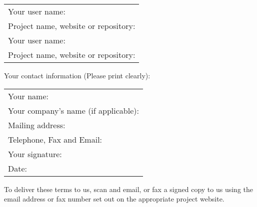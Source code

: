 \begin{tabular}{l}
  Your user name:                       \\
  Project name, website or repository: \\
  Your user name:                       \\
  Project name, website or repository: \\
\end{tabular}

Your contact information (Please print clearly):

\begin{tabular}{l}
  Your name:                             \\
  Your company's name (if applicable):   \\
  Mailing address:                       \\
  Telephone, Fax and Email:              \\
  Your signature:                        \\
  Date:                                  \\
\end{tabular}


To deliver these terms to us, scan and email, or fax a signed copy to us
using the  email address or fax number set out on
the appropriate project website.



